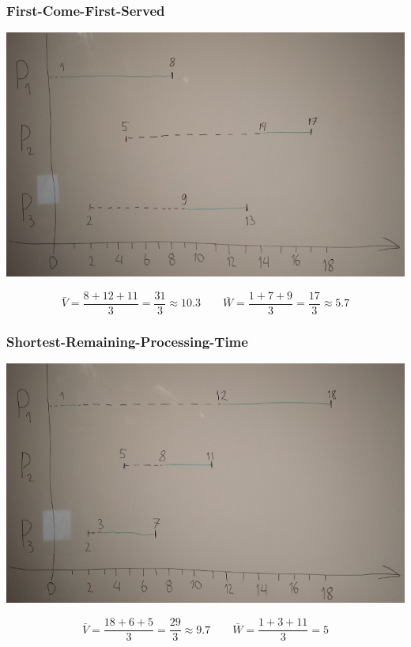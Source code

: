\documentclass[10pt,a4paper]{article}
\begin{document}
\subsubsection*{First-Come-First-Served}

\includegraphics[width=\textwidth]{sheet-7/exercise-2-3-1}

\begin{equation*}
  \bar{V} = \frac{8 + 12 + 11}{3} = \frac{31}{3} \approx 10.3 \qquad \bar{W} = \frac{1 + 7 + 9}{3} = \frac{17}{3} \approx 5.7
\end{equation*}

\subsubsection*{Shortest-Remaining-Processing-Time}

\includegraphics[width=\textwidth]{sheet-7/exercise-2-3-2}

\begin{equation*}
  \bar{V} = \frac{18 + 6 + 5}{3} = \frac{29}{3} \approx 9.7 \qquad \bar{W} = \frac{1 + 3 + 11}{3} = 5
\end{equation*}
\end{document}
